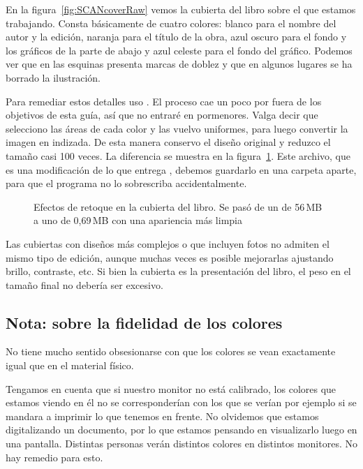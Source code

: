 \documentclass[%
	a5paper,
	10pt,
	twoside,
	openright,
	final,
]{memoir}
\begin{document}
{	En la figura~\ref{fig:SCANcoverRaw} vemos la cubierta del libro sobre el que estamos trabajando. Consta básicamente de cuatro colores: blanco para el nombre del autor y la edición, naranja para el título de la obra, azul oscuro para el fondo y los gráficos de la parte de abajo y azul celeste para el fondo del gráfico. Podemos ver que en las esquinas presenta marcas de doblez y que en algunos lugares se ha borrado la ilustración.

	Para remediar estos detalles uso \gimp. El proceso cae un poco por fuera de los objetivos de esta guía, así que no entraré en pormenores. Valga decir que selecciono las áreas de cada color y las vuelvo uniformes, para luego convertir la imagen en indizada. De esta manera conservo el diseño original y reduzco el tamaño casi 100 veces. La diferencia se muestra en la figura~\ref{fig:SCANcover}. Este archivo, que es una modificación de lo que entrega \scantailor, debemos guardarlo en una carpeta aparte, para que el programa no lo sobrescriba accidentalmente.

	\begin{figure}
		\centering
		\hfill
		\caption[Efectos de retoque en la cubierta del libro]{Efectos de retoque en la cubierta del libro. Se pasó de un \tiff de 56\,MB a uno de 0,69\,MB con una apariencia más limpia\label{fig:SCANcover}}
	\end{figure}

	Las cubiertas con diseños más complejos o que incluyen fotos no admiten el mismo tipo de edición, aunque muchas veces es posible mejorarlas ajustando brillo, contraste, etc. Si bien la cubierta es la presentación del libro, el peso en el tamaño final no debería ser excesivo.

	\subsection{Nota: sobre la fidelidad de los colores} No tiene mucho sentido obsesionarse con que los colores se vean exactamente igual que en el material físico.

	Tengamos en cuenta que si nuestro monitor no está calibrado, los colores que estamos viendo en él no se corresponderían con los que se verían por ejemplo si se mandara a imprimir lo que tenemos en frente. No olvidemos que estamos digitalizando un documento, por lo que estamos pensando en visualizarlo luego en una pantalla. Distintas personas verán distintos colores en distintos monitores. No hay remedio para esto.

}
\end{document}
